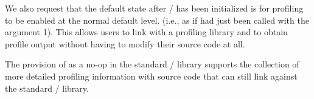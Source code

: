 We also request that the default state after \MPI/ has been
initialized is for profiling to be enabled at the normal default level.  (i.e.,
as if  had just been called with the argument 1).
This allows users to link with a profiling library and to obtain profile
output without having to modify their source code at all.

The provision of  as a no-op in the standard \MPI/
library supports the collection of more detailed profiling information with
source code that can still link against the standard \MPI/ library.

